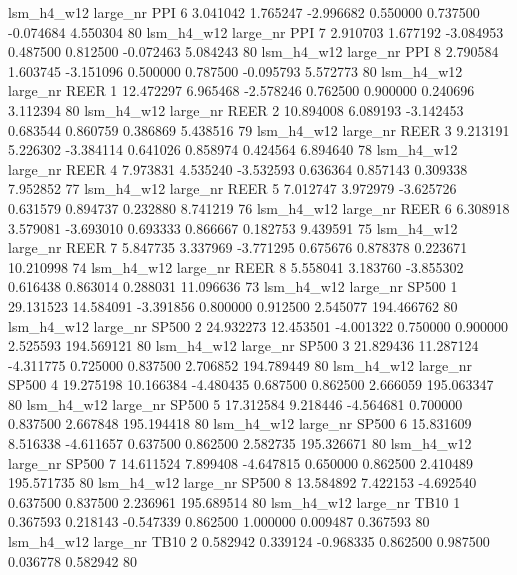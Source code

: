   lsm_h4_w12   large_nr      PPI                 6  3.041042  1.765247  -2.996682 0.550000 0.737500 -0.074684    4.550304 80
  lsm_h4_w12   large_nr      PPI                 7  2.910703  1.677192  -3.084953 0.487500 0.812500 -0.072463    5.084243 80
  lsm_h4_w12   large_nr      PPI                 8  2.790584  1.603745  -3.151096 0.500000 0.787500 -0.095793    5.572773 80
  lsm_h4_w12   large_nr     REER                 1 12.472297  6.965468  -2.578246 0.762500 0.900000  0.240696    3.112394 80
  lsm_h4_w12   large_nr     REER                 2 10.894008  6.089193  -3.142453 0.683544 0.860759  0.386869    5.438516 79
  lsm_h4_w12   large_nr     REER                 3  9.213191  5.226302  -3.384114 0.641026 0.858974  0.424564    6.894640 78
  lsm_h4_w12   large_nr     REER                 4  7.973831  4.535240  -3.532593 0.636364 0.857143  0.309338    7.952852 77
  lsm_h4_w12   large_nr     REER                 5  7.012747  3.972979  -3.625726 0.631579 0.894737  0.232880    8.741219 76
  lsm_h4_w12   large_nr     REER                 6  6.308918  3.579081  -3.693010 0.693333 0.866667  0.182753    9.439591 75
  lsm_h4_w12   large_nr     REER                 7  5.847735  3.337969  -3.771295 0.675676 0.878378  0.223671   10.210998 74
  lsm_h4_w12   large_nr     REER                 8  5.558041  3.183760  -3.855302 0.616438 0.863014  0.288031   11.096636 73
  lsm_h4_w12   large_nr    SP500                 1 29.131523 14.584091  -3.391856 0.800000 0.912500  2.545077  194.466762 80
  lsm_h4_w12   large_nr    SP500                 2 24.932273 12.453501  -4.001322 0.750000 0.900000  2.525593  194.569121 80
  lsm_h4_w12   large_nr    SP500                 3 21.829436 11.287124  -4.311775 0.725000 0.837500  2.706852  194.789449 80
  lsm_h4_w12   large_nr    SP500                 4 19.275198 10.166384  -4.480435 0.687500 0.862500  2.666059  195.063347 80
  lsm_h4_w12   large_nr    SP500                 5 17.312584  9.218446  -4.564681 0.700000 0.837500  2.667848  195.194418 80
  lsm_h4_w12   large_nr    SP500                 6 15.831609  8.516338  -4.611657 0.637500 0.862500  2.582735  195.326671 80
  lsm_h4_w12   large_nr    SP500                 7 14.611524  7.899408  -4.647815 0.650000 0.862500  2.410489  195.571735 80
  lsm_h4_w12   large_nr    SP500                 8 13.584892  7.422153  -4.692540 0.637500 0.837500  2.236961  195.689514 80
  lsm_h4_w12   large_nr     TB10                 1  0.367593  0.218143  -0.547339 0.862500 1.000000  0.009487    0.367593 80
  lsm_h4_w12   large_nr     TB10                 2  0.582942  0.339124  -0.968335 0.862500 0.987500  0.036778    0.582942 80
